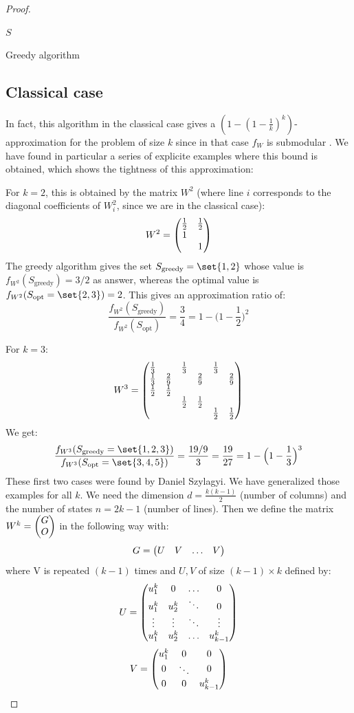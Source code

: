 \documentclass{article}
\theoremstyle{definition}
\theoremstyle{remark}
\begin{document}
\begin{proof}
\begin{algorithm}[H]
         \Return $S$
         \caption{Greedy algorithm}
         \label{greedy}
    \end{algorithm}

    \subsection{Classical case}
    In fact, this algorithm in the classical case gives a $(1-(1-\frac{1}{k})^k)$-approximation for the problem of size $k$ since in that case $f_W$ is submodular \cite{BF17}. We have found in particular a series of explicite examples where this bound is obtained, which shows the tightness of this approximation:
    
    For $k=2$, this is obtained by the matrix $W^2$ (where line $i$ corresponds to the diagonal coefficients of $W^2_i$, since we are in the classical case):
    \[W^2 = \pmqty{\frac{1}{2} & \frac{1}{2}\\1 & \\ & 1}\]
    The greedy algorithm gives the set $S_{\text{greedy}}=\set{1,2}$ whose value is $f_{W^2}(S_{\text{greedy}})=3/2$ as answer, whereas the optimal value is $f_{W^2}(S_{\text{opt}}=\set{2,3}) = 2$. This gives an approximation ratio of:
    \[\frac{f_{W^2}(S_{\text{greedy}})}{f_{W^2}(S_{\text{opt}})}= \frac{3}{4} = 1-\Big(1-\frac{1}{2}\Big)^2\]
    
    For $k=3$:
    \[W^3= \pmqty{\frac{1}{3} &  & \frac{1}{3} &  & \frac{1}{3} & \\\frac{1}{3} & \frac{2}{9} &  & \frac{2}{9} &  & \frac{2}{9}\\\frac{1}{2} & \frac{1}{2} &  &  &  & \\ &  & \frac{1}{2} & \frac{1}{2} &  & \\ &  &  &  & \frac{1}{2} & \frac{1}{2}\\}\]
    We get:
     \[\frac{f_{W^3}(S_{\text{greedy}}=\set{1,2,3})}{f_{W^3}(S_{\text{opt}}=\set{3,4,5})}= \frac{19/9}{3} = \frac{19}{27} = 1-\Big(1-\frac{1}{3}\Big)^3\]
     These first two cases were found by Daniel Szylagyi. We have generalized those examples for all $k$. We need the dimension $d=\frac{k(k-1)}{2}$ (number of columns) and the number of states $n=2k-1$ (number of lines). Then we define the matrix $W^k = \pmqty{G\\O}$ in the following way with:
     \[G = \pmqty{U & V & \ldots & V}\]
     where V is repeated $(k-1)$ times and $U,V$ of size $(k-1) \times k $ defined by:
     \[U = \pmqty{u^k_1 & 0 & \ldots & 0 \\
       u^k_1 & u^k_2 & \ddots & 0 \\
       \vdots & \vdots & \ddots & \vdots \\
       u^k_1 & u^k_2 & \ldots  & u^k_{k-1} \\
     }\]
     \[V = \pmqty{\dmat[0]{u^k_1,\ddots, u^k_{k-1}}}\]



\end{proof}
\end{document}
